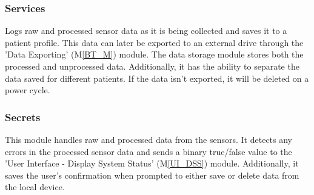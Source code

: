\documentclass{article}
\begin{document}
\begin{description}
        \subsubsection{Services}
        Logs raw and processed sensor data as it is being collected and saves it to a patient profile. This data can later be exported to an external drive through the 'Data Exporting' (M\ref{BT_M}) module. 
        The data storage module stores both the processed and unprocessed data.  Additionally, it has the ability to separate the data saved for different patients.  If the data isn't exported, it will be deleted on a power cycle.   
        \subsubsection{Secrets}
        This module handles raw and processed data from the sensors. It detects any errors in the processed sensor data and sends a binary true/false value to the 'User Interface - Display System Status' (M\ref{UI_DSS}) module. Additionally, it saves the user's confirmation when prompted to either save or delete data from the local device. 
        \newpage

\end{description}
\end{document}
